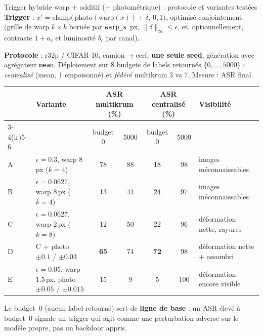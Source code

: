 \documentclass[aspectratio=169,10pt]{beamer}
\begin{document}
\begin{frame}{Trigger hybride warp + additif (+ photométrique) : protocole et variantes testées}
\small
\textbf{Trigger} : $x' = \mathrm{clamp}\big(\,\mathrm{photo}(\mathrm{warp}(x)) + \delta,\,0,1\big)$, optimisé conjointement
(grille de warp $k\times k$ bornée par \texttt{warp\_s}~px, $\|\delta\|_\infty\le\epsilon$, et, optionnellement, contraste $1{+}a_c$ et luminosité $b_c$ par canal).

\medskip
\textbf{Protocole} : r32p / CIFAR-10, camion$\to$cerf, \textbf{une seule seed}, génération avec agrégateur \texttt{mean}.
Déploiement sur 8 budgets de labels retournés $\{0,\dots,5000\}$ : \emph{centralisé} (mean, 1 empoisonné)
et \emph{fédéré} multikrum 3 vs 7. Mesure : ASR final.

\medskip
\centering
\scriptsize
\setlength{\tabcolsep}{3pt}
\begin{tabular}{@{}llcccc@{\hspace{8pt}}l@{}}
\toprule
& Variante & \multicolumn{2}{c}{ASR multikrum (\%)} & \multicolumn{2}{c}{ASR centralisé (\%)} & Visibilité \\
\cmidrule(lr){3-4}\cmidrule(lr){5-6}
& & budget 0 & 5000 & budget 0 & 5000 & \\
\midrule
A & $\epsilon{=}0.3$, warp 8\,px ($k{=}4$)            & 78 & 88 & 18 & 98  & images méconnaissables \\
B & $\epsilon{=}0.0627$, warp 8\,px ($k{=}4$)         & 13 & 41 & 24 & 97  & images méconnaissables \\
C & $\epsilon{=}0.0627$, warp 2\,px ($k{=}8$)         & 12 & 50 & 22 & 96  & déformation nette, rayures \\
D & C + photo $\pm0.1$ / $\pm0.03$                      & \textbf{65} & 74 & \textbf{72} & 98 & déformation nette + assombri \\
E & $\epsilon{=}0.05$, warp 1.5\,px, photo $\pm0.05$ / $\pm0.015$ & 15 & 9 & 5 & 100 & déformation encore visible \\
\bottomrule
\end{tabular}

\medskip
\raggedright
\footnotesize
\vspace{-1mm}
Le budget~0 (aucun label retourné) sert de \textbf{ligne de base} : un ASR élevé à budget~0 signale un trigger qui agit comme une perturbation adverse sur le modèle propre, pas un backdoor appris.
\end{frame}
\end{document}
